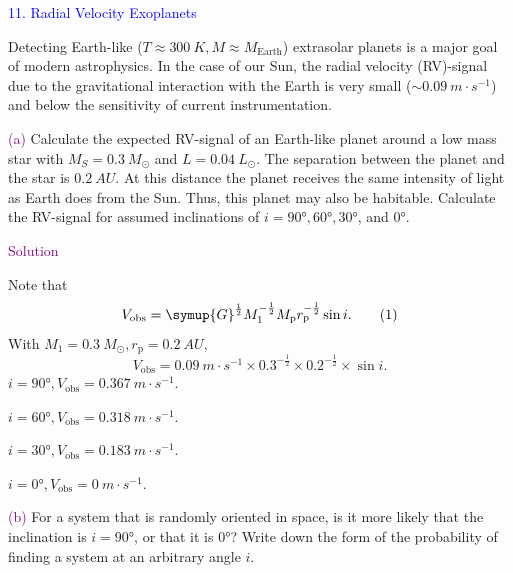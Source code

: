 \documentclass[UTF8, 12pt, a4paper, oneside, twocolumn, fontset=none]{ctexart}
\begin{document}
\hspace*{\fill}

\noindent\textcolor{blue}{11. Radial Velocity Exoplanets}

\noindent Detecting Earth-like ($T\approx\qty{300}{K}, M\approx{}M_{\mathrm{Earth}}$) extrasolar planets is a major goal of modern astrophysics. In the case of our Sun, the radial velocity (RV)-signal due to the gravitational interaction with the Earth is very small ($\sim\qty{0.09}{m\cdot{}s^{-1}}$) and below the sensitivity of current instrumentation.

\hspace*{\fill}

\noindent\textcolor{purple}{(a)} Calculate the expected RV-signal of an Earth-like planet around a low mass star with $M_{S}=\qty{0.3}{M_{\odot}}$ and $L=\qty{0.04}{L_{\odot}}$. The separation between the planet and the star is $\qty{0.2}{AU}$. At this distance the planet receives the same intensity of light as Earth does from the Sun. Thus, this planet may also be habitable. Calculate the RV-signal for assumed inclinations of $i=\ang{90;;}, \ang{60;;}, \ang{30;;}$, and $\ang{0;;}$.

\hspace*{\fill}

\noindent\textcolor{purple}{Solution}

Note that
\begin{equation}
V_{\mathrm{obs}}=\symup{G}^{\frac{1}{2}}M_{1}^{-\frac{1}{2}}M_{\mathrm{p}}r_{\mathrm{p}}^{-\frac{1}{2}}\sin{i}.\tag{1}
\end{equation}
With $M_{1}=\qty{0.3}{M_{\odot}}, r_{\mathrm{p}}=\qty{0.2}{AU}$,
\begin{equation}
V_{\mathrm{obs}}=\qty{0.09}{m\cdot{}s^{-1}}\times0.3^{-\frac{1}{2}}\times0.2^{-\frac{1}{2}}\times\sin{i}.\tag{2}
\end{equation}
$i=\ang{90;;}, V_{\mathrm{obs}}=\qty{0.367}{m\cdot{}s^{-1}}$.

\noindent $i=\ang{60;;}, V_{\mathrm{obs}}=\qty{0.318}{m\cdot{}s^{-1}}$.

\noindent $i=\ang{30;;}, V_{\mathrm{obs}}=\qty{0.183}{m\cdot{}s^{-1}}$.

\noindent $i=\ang{0;;}, V_{\mathrm{obs}}=\qty{0}{m\cdot{}s^{-1}}$.

\hspace*{\fill}

\noindent\textcolor{purple}{(b)} For a system that is randomly oriented in space, is it more likely that the inclination is $i=\ang{90;;}$, or that it is $\ang{0;;}$? Write down the form of the probability of finding a system at an arbitrary angle $i$.
\end{document}
